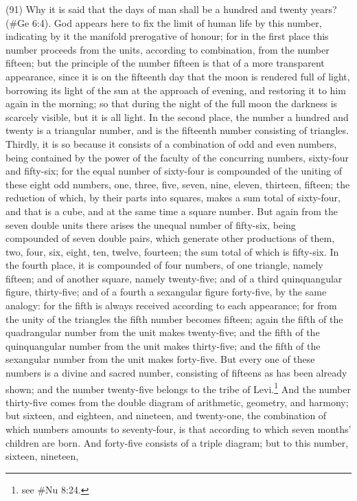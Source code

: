 (91) Why it is said that the days of man shall be a hundred and twenty years? (\#Ge 6:4). God
appears here to fix the limit of human life by this number, indicating by it the manifold prerogative of
honour; for in the first place this number proceeds from the units, according to combination, from
the number fifteen; but the principle of the number fifteen is that of a more transparent
appearance, since it is on the fifteenth day that the moon is rendered full of light, borrowing its light
of the sun at the approach of evening, and restoring it to him again in the morning; so that during
the night of the full moon the darkness is scarcely visible, but it is all light. In the second place, the
number a hundred and twenty is a triangular number, and is the fifteenth number consisting of
triangles. Thirdly, it is so because it consists of a combination of odd and even numbers, being
contained by the power of the faculty of the concurring numbers, sixty-four and fifty-six; for the
equal number of sixty-four is compounded of the uniting of these eight odd numbers, one, three,
five, seven, nine, eleven, thirteen, fifteen; the reduction of which, by their parts into squares, makes
a sum total of sixty-four, and that is a cube, and at the same time a square number. But again from
the seven double units there arises the unequal number of fifty-six, being compounded of seven
double pairs, which generate other productions of them, two, four, six, eight, ten, twelve, fourteen;
the sum total of which is fifty-six. In the fourth place, it is compounded of four numbers, of one
triangle, namely fifteen; and of another square, namely twenty-five; and of a third quinquangular
figure, thirty-five; and of a fourth a sexangular figure forty-five, by the same analogy: for the fifth is
always received according to each appearance; for from the unity of the triangles the fifth number
becomes fifteen; again the fifth of the quadrangular number from the unit makes twenty-five; and
the fifth of the quinquangular number from the unit makes thirty-five; and the fifth of the sexangular
number from the unit makes forty-five. But every one of these numbers is a divine and sacred
number, consisting of fifteens as has been already shown; and the number twenty-five belongs to
the tribe of Levi.\footnote{see \#Nu 8:24.} And the number thirty-five comes from the double diagram of
arithmetic, geometry, and harmony; but sixteen, and eighteen, and nineteen, and twenty-one, the
combination of which numbers amounts to seventy-four, is that according to which seven months'
children are born. And forty-five consists of a triple diagram; but to this number, sixteen, nineteen,
